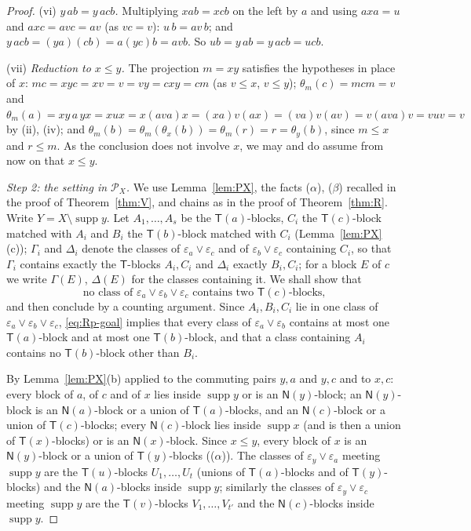 \documentclass[11pt]{amsart}
\theoremstyle{definition}
\renewcommand{\P}{\mathcal{P}}
\newcommand{\supp}{\operatorname{supp}}
\newcommand{\T}{\mathsf{T}}
\newcommand{\N}{\mathsf{N}}
\begin{document}
\begin{proof}
(vi) \emph{$y\,ab=y\,acb$.} Multiplying $xab=xcb$ on the left by $a$ and using $axa=u$ and $axc=avc=av$ (as $vc=v$): $u\,b=av\,b$; and $y\,acb=(ya)(cb)=a(yc)b=avb$. So $ub=y\,ab=y\,acb=ucb$.

(vii) \emph{Reduction to $x\le y$.} The projection $m=xy$ satisfies the hypotheses in place of $x$: $mc=xyc=xv=v=vy=cxy=cm$ (as $v\le x$, $v\le y$); $\theta_m(c)=mcm=v$ and $\theta_m(a)=xy\,a\,yx=xux=x(ava)x=(xa)v(ax)=(va)v(av)=v(ava)v=vuv=v$ by (ii), (iv); and $\theta_m(b)=\theta_m(\theta_x(b))=\theta_m(r)=r=\theta_y(b)$, since $m\le x$ and $r\le m$. As the conclusion does not involve $x$, we may and do assume from now on that $x\le y$.

\smallskip
\emph{Step 2: the setting in $\P_X$.} We use Lemma~\ref{lem:PX}, the facts ($\alpha$), ($\beta$) recalled in the proof of Theorem~\ref{thm:V}, and chains as in the proof of Theorem~\ref{thm:R}. Write $Y=X\setminus\supp y$. Let $A_1,\dots,A_s$ be the $\T(a)$-blocks, $C_i$ the $\T(c)$-block matched with $A_i$ and $B_i$ the $\T(b)$-block matched with $C_i$ (Lemma~\ref{lem:PX}(c)); $\Gamma_i$ and $\Delta_i$ denote the classes of $\varepsilon_a\vee\varepsilon_c$ and of $\varepsilon_b\vee\varepsilon_c$ containing $C_i$, so that $\Gamma_i$ contains exactly the $\T$-blocks $A_i,C_i$ and $\Delta_i$ exactly $B_i,C_i$; for a block $E$ of $c$ we write $\Gamma(E)$, $\Delta(E)$ for the classes containing it. We shall show that
\begin{equation}\label{eq:Rp-goal}
\text{no class of }\varepsilon_a\vee\varepsilon_b\vee\varepsilon_c\text{ contains two }\T(c)\text{-blocks,}
\end{equation}
and then conclude by a counting argument. Since $A_i,B_i,C_i$ lie in one class of $\varepsilon_a\vee\varepsilon_b\vee\varepsilon_c$, \eqref{eq:Rp-goal} implies that every class of $\varepsilon_a\vee\varepsilon_b$ contains at most one $\T(a)$-block and at most one $\T(b)$-block, and that a class containing $A_i$ contains no $\T(b)$-block other than $B_i$.

By Lemma~\ref{lem:PX}(b) applied to the commuting pairs $y,a$ and $y,c$ and to $x,c$: every block of $a$, of $c$ and of $x$ lies inside $\supp y$ or is an $\N(y)$-block; an $\N(y)$-block is an $\N(a)$-block or a union of $\T(a)$-blocks, and an $\N(c)$-block or a union of $\T(c)$-blocks; every $\N(c)$-block lies inside $\supp x$ (and is then a union of $\T(x)$-blocks) or is an $\N(x)$-block. Since $x\le y$, every block of $x$ is an $\N(y)$-block or a union of $\T(y)$-blocks (($\alpha$)). The classes of $\varepsilon_y\vee\varepsilon_a$ meeting $\supp y$ are the $\T(u)$-blocks $U_1,\dots,U_t$ (unions of $\T(a)$-blocks and of $\T(y)$-blocks) and the $\N(a)$-blocks inside $\supp y$; similarly the classes of $\varepsilon_y\vee\varepsilon_c$ meeting $\supp y$ are the $\T(v)$-blocks $V_1,\dots,V_{t'}$ and the $\N(c)$-blocks inside $\supp y$.


\end{proof}
\end{document}
